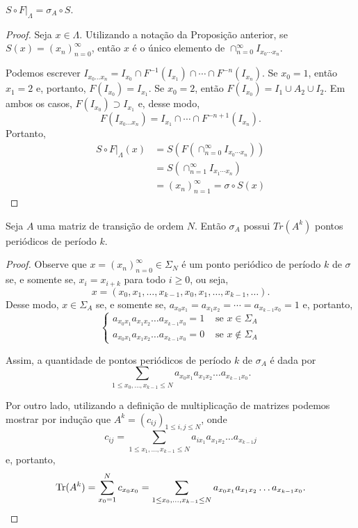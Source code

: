 \begin{theorem}
$S \circ F|_\Lambda = \sigma_A \circ S$.
\end{theorem}


\begin{proof}
Seja $x \in \Lambda$. Utilizando a notação da Proposição anterior, se $S(x) = (x_n)_{n=0}^\infty$, então $x$ é o único elemento de $\cap_{n=0}^\infty I_{x_0 \cdots x_n}$.

Podemos escrever $I_{x_0 \dots x_n} = I_{x_0} \cap F^{-1}(I_{x_1}) \cap \cdots \cap F^{-n}(I_{x_n})$. Se $x_0 = 1$, então $x_1 = 2$ e, portanto, $F(I_{x_0}) = I_{x_1}$. Se $x_0 = 2$, então $F(I_{x_0}) = I_1 \cup A_2 \cup I_2$. Em ambos os casos, $F(I_{x_0}) \supset I_{x_1}$ e, desse modo,
$$F(I_{x_0 \dots x_n}) = I_{x_1} \cap \cdots \cap F^{-n+1}(I_{x_n}).$$
Portanto,
\begin{align*}
S \circ F|_{\Lambda}(x) & = S(F(\cap_{n=0}^\infty I_{x_0 \cdots x_n})) \\
& = S(\cap_{n=1}^\infty I_{x_1 \cdots x_n}) \\
& = (x_n)_{n=1}^\infty  = \sigma \circ S(x)
\end{align*}
\end{proof}


\begin{proposition}
Seja $A$ uma matriz de transição de ordem $N$. Então $\sigma_A$ possui $Tr(A^k)$ pontos periódicos de período $k$.
\end{proposition}


\begin{proof}
Observe que $x = (x_n)_{n=0}^\infty \in \Sigma_N$ é um ponto periódico de período $k$ de $\sigma$ se, e somente se, $x_i = x_{i+k}$ para todo $i \geq 0$, ou seja,
$$x = (x_0, x_1, \dots, x_{k-1}, x_0, x_1, \dots, x_{k-1}, \dots).$$
Desse modo, $x \in \Sigma_A$ se, e somente se, $a_{x_0 x_1} = a_{x_1 x_2} = \cdots = a_{x_{k-1} x_0} = 1$ e, portanto,
\[\begin{cases} 
  a_{x_0 x_1} a_{x_1 x_2}  \dots a_{x_{k-1} x_0} = 1 & \textrm{ se } x \in \Sigma_A \\
  a_{x_0 x_1} a_{x_1 x_2}  \dots a_{x_{k-1} x_0} = 0 & \textrm{ se } x \notin \Sigma_A 
       \end{cases}
\]

Assim, a quantidade de pontos periódicos de período $k$ de $\sigma_A$ é dada por
$$\sum_{1 \leq x_0, \dots, x_{k-1} \leq N} a_{x_0 x_1} a_{x_1 x_2}  \dots a_{x_{k-1} x_0}.$$

Por outro lado, utilizando a definição de multiplicação de matrizes podemos mostrar por indução que $A^k = (c_{ij})_{1 \leq i, j \leq N}$, onde
$$c_{ij} = \sum_{1 \leq x_1, \dots, x_{k-1} \leq N} a_{i x_1} a_{x_1 x_2}  \dots a_{x_{k-1}j}$$
e, portanto,
$$\operatorname{Tr}(A^k) = \sum_{x_0 = 1}^N c_{x_0 x_0} = \sum_{1 \leq x_0, \dots, x_{k-1} \leq N} a_{x_0 x_1} a_{x_1 x_2}  \dots a_{x_{k-1} x_0}.$$
\end{proof}











